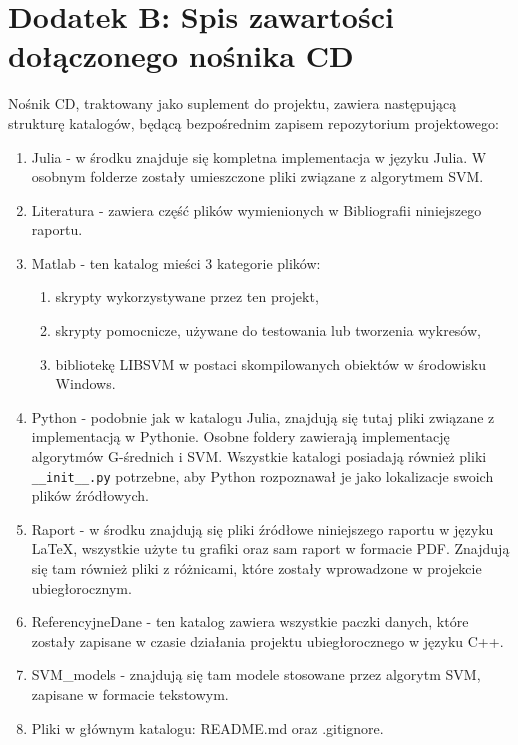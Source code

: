 \section*{Dodatek B: Spis zawartości dołączonego nośnika CD}
\label{dodatekB}

\qquad Nośnik CD, traktowany jako suplement do projektu, zawiera następującą strukturę katalogów, będącą bezpośrednim zapisem repozytorium projektowego: 

\begin{enumerate}
	\item Julia - w środku znajduje się kompletna implementacja w języku Julia. W osobnym folderze zostały umieszczone pliki związane z algorytmem SVM.
	\item Literatura - zawiera część plików wymienionych w Bibliografii niniejszego raportu.
	\item Matlab - ten katalog mieści 3 kategorie plików:
	\begin{enumerate}
		\item skrypty wykorzystywane przez ten projekt,
		\item skrypty pomocnicze, używane do testowania lub tworzenia wykresów,
		\item bibliotekę LIBSVM w postaci skompilowanych obiektów w środowisku Windows.
	\end{enumerate}
	\item Python - podobnie jak w katalogu Julia, znajdują się tutaj pliki związane z implementacją w Pythonie. Osobne foldery zawierają implementację algorytmów G-średnich i SVM. Wszystkie katalogi posiadają również pliki \texttt{\_\_init\_\_.py} potrzebne, aby Python rozpoznawał je jako lokalizacje swoich plików źródłowych.
	\item Raport - w środku znajdują się pliki źródłowe niniejszego raportu w języku LaTeX, wszystkie użyte tu grafiki oraz sam raport w formacie PDF. Znajdują się tam również pliki z różnicami, które zostały wprowadzone w projekcie ubiegłorocznym.
	\item ReferencyjneDane - ten katalog zawiera wszystkie paczki danych, które zostały zapisane w czasie działania projektu ubiegłorocznego w języku C++.
	\item SVM\_models - znajdują się tam modele stosowane przez algorytm SVM, zapisane w formacie tekstowym.
	\item Pliki w głównym katalogu: README.md oraz .gitignore.
\end{enumerate}